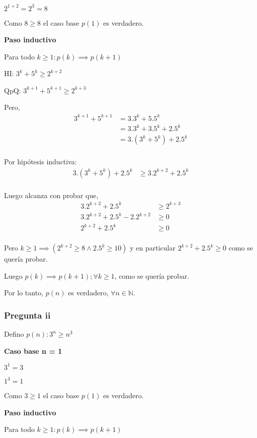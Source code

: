 $2^{1+2} = 2^3 = 8$

Como $ 8 \geq 8 $ el caso base $p(1)$ es verdadero.

\textbf{Paso inductivo}

Para todo $k \geq 1: p(k) \implies p(k+1)$

HI: $ 3^k + 5^k \geq 2^{k+2}$

QpQ: $ 3^{k+1} + 5^{k+1} \geq 2^{k+3}$

Pero,
\begin{align*}
    3^{k+1} + 5^{k+1} &= 3.3^k + 5.5^k \\ 
    &= 3.3^k + 3.5^k + 2.5^k \\
    &= 3.(3^k + 5^k) + 2.5^k \\
\end{align*}

Por hipótesis inductiva:
\begin{align*}
    3.(3^k + 5^k) + 2.5^k &\geq 3.2^{k+2} + 2.5^k \\
\end{align*}

Luego alcanza con probar que,
\begin{align*}
    3.2^{k+2} + 2.5^k &\geq 2^{k+3} \\
    3.2^{k+2} + 2.5^k - 2.2^{k+2} &\geq 0 \\
    2^{k+2} + 2.5^k &\geq 0 \\
\end{align*}

Pero $k \geq 1 \implies (2^{k+2} \geq 8 \wedge 2.5^k \geq 10)$ y en particular $2^{k+2} + 2.5^k \geq 0 $ como se quería probar.

Luego $p(k) \implies p(k+1); \forall k \geq 1$, como se quería probar.

Por lo tanto, $p(n)$ es verdadero, $\forall n \in \mathbb{N}$.

\subsubsection{Pregunta ii}

Defino $ p(n): 3^n \geq n^3$

\textbf{Caso base n = 1}

$ 3^1 = 3 $

$ 1^3 = 1 $

Como $ 3 \geq 1 $ el caso base $p(1)$ es verdadero.

\textbf{Paso inductivo}

Para todo $k \geq 1: p(k) \implies p(k+1)$

